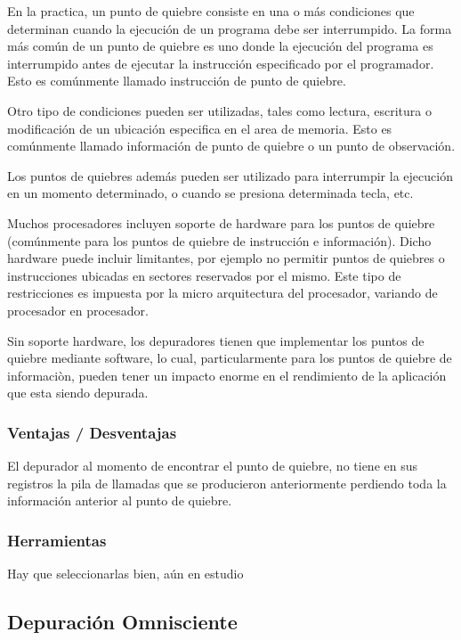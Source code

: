 \documentclass[12pt,legalpaper]{report}
\begin{document}
En la practica, un punto de quiebre consiste en una o más condiciones que determinan cuando la ejecución de un programa debe ser interrumpido.  La forma más común de un punto de quiebre es uno donde la ejecución del programa es interrumpido antes de ejecutar la instrucción especificado por el programador.  Esto es comúnmente llamado instrucción de punto de quiebre.

Otro tipo de condiciones pueden ser utilizadas, tales como lectura, escritura o modificación de un ubicación especifica en el area de memoria.  Esto es comúnmente llamado información de punto de quiebre o un punto de observación.

Los puntos de quiebres además pueden ser utilizado para interrumpir la ejecución en un momento determinado, o cuando se presiona determinada tecla, etc.

Muchos procesadores incluyen soporte de hardware para los puntos de quiebre (comúnmente para los puntos de quiebre de instrucción e información).  Dicho hardware puede incluir limitantes, por ejemplo no permitir puntos de quiebres o instrucciones ubicadas en sectores reservados por el mismo.  Este tipo de restricciones es impuesta por la micro arquitectura del procesador, variando de procesador en procesador.

Sin soporte hardware, los depuradores tienen que implementar los puntos de quiebre mediante software, lo cual, particularmente para los puntos de quiebre de informaciòn, pueden tener un impacto enorme en el rendimiento de la aplicación que esta siendo depurada.


			\subsubsection{Ventajas / Desventajas}

El depurador al momento de encontrar el punto de quiebre, no tiene en sus registros la pila de llamadas que se producieron anteriormente perdiendo toda la información anterior al punto de quiebre.

			\subsubsection{Herramientas}

Hay que seleccionarlas bien, aún en estudio

		\subsection{Depuración Omnisciente}
\end{document}
